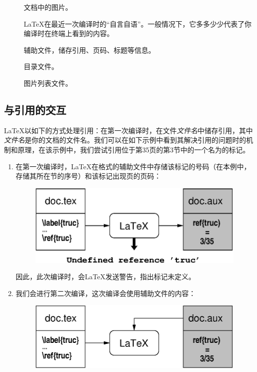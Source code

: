 \begin{description}
  \item[] 文档中的图片。
  \item[] \LaTeX 在最近一次编译时的“自言自语”。一般情况下，它多多少少代表了你编译时在终端上看到的内容。
  \item[] 辅助文件，储存引用、页码、标题等信息。
  \item[] 目录文件。
  \item[] 图片列表文件。
\end{description}

\subsection{与引用的交互}

\LaTeX 以如下的方式处理引用：在第一次编译时，在文件\textsl{\<文件名\>}中储存引用，其中\textsl{\<文件名\>}是你的文档的文件名。我们可以在如下示例中看到其解决引用的问题时的机制和原理，在该示例中，我们尝试引用位于第35页的第3节中的一个名为的标记。

\begin{enumerate}
  \item 在第一次编译时，\LaTeX 在格式的辅助文件中存储该标记的号码（在本例中，存储其所在节的序号）和该标记出现页的页码：
  
  \begin{figure}[h]
    \begin{center}
      \includegraphics{img/ref1.eps}
    \end{center}
  \end{figure}

  因此，此次编译时，会\LaTeX 发送警告，指出标记未定义。
  \item 我们会进行第二次编译，这次编译会使用辅助文件的内容：
  
  \begin{figure}[h]
    \begin{center}
      \includegraphics{img/ref2.eps}
    \end{center}
  \end{figure}
\end{enumerate}

